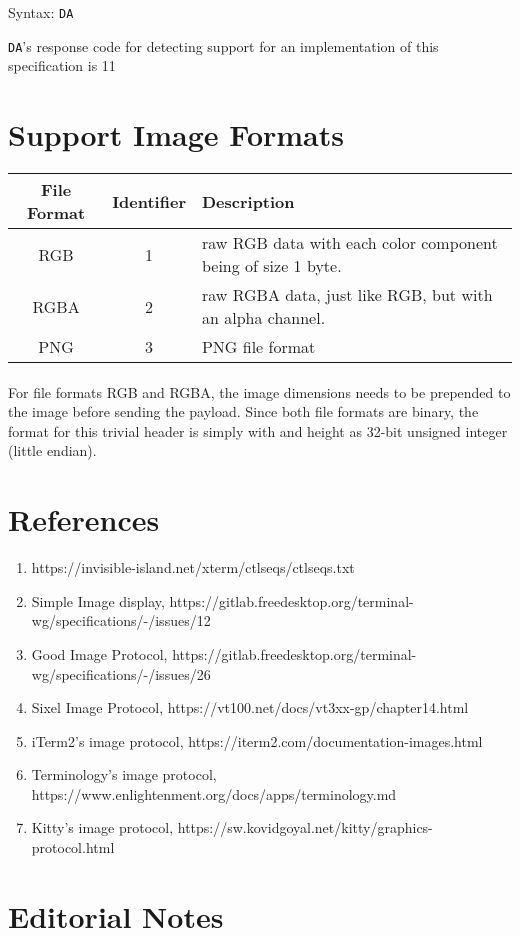 \documentclass{article}
\newcommand{\code}[1]{\colorbox{light-gray}{\texttt{#1}}}
\newcommand{\DA}{\code{DA}}
\begin{document}
Syntax: \DA

\DA's response code for detecting support for an implementation of this specification is 11

\section{Support Image Formats} %

\label{sec:supported-image-formtats}

\begin{tabular}{c | c | l}
    File Format & Identifier & Description \\ \hline
    RGB & 1 & raw RGB data with each color component being of size 1 byte. \\
    RGBA & 2 & raw RGBA data, just like RGB, but with an alpha channel. \\
    PNG & 3 & PNG file format \\
\end{tabular}

\paragraph{}

For file formats RGB and RGBA, the image dimensions needs to be prepended to the image
before sending the payload. Since both file formats are binary, the format for this trivial header
is simply with and height as 32-bit unsigned integer (little endian).

\section{References} %

\begin{enumerate}
    \item \label{ref:ctlseqs}https://invisible-island.net/xterm/ctlseqs/ctlseqs.txt
    \item \label{ref:simple-image-display}Simple Image display, https://gitlab.freedesktop.org/terminal-wg/specifications/-/issues/12
    \item \label{ref:gip}Good Image Protocol, https://gitlab.freedesktop.org/terminal-wg/specifications/-/issues/26
    \item \label{ref:image-sixel}Sixel Image Protocol, https://vt100.net/docs/vt3xx-gp/chapter14.html
    \item \label{ref:image-item2}iTerm2's image protocol, https://iterm2.com/documentation-images.html
    \item \label{ref:image-terminology}Terminology's image protocol, https://www.enlightenment.org/docs/apps/terminology.md 
    \item \label{ref:image-kitty}Kitty's image protocol, https://sw.kovidgoyal.net/kitty/graphics-protocol.html
\end{enumerate}

\section{Editorial Notes}
\listoftodos
\end{document}
